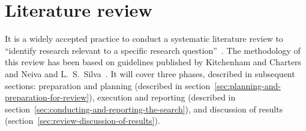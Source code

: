 \chapter{Literature review}\label{ch:literature-review}

It is a widely accepted practice to conduct a systematic literature review to \enquote{identify research relevant to a specific research question}~\cite{kitchenham_guidelines_2007}.
The methodology of this review has been based on guidelines published by Kitchenham and Charters~\cite{kitchenham_guidelines_2007} and Neiva and L.~S.~Silva~\cite{neiva_systematic_2016}.
It will cover three phases, described in subsequent sections: preparation and planning (described in section~\ref{sec:planning-and-preparation-for-review}), execution and reporting (described in section~\ref{sec:conducting-and-reporting-the-search}), and discussion of results (section~\ref{sec:review-discussion-of-results}).






